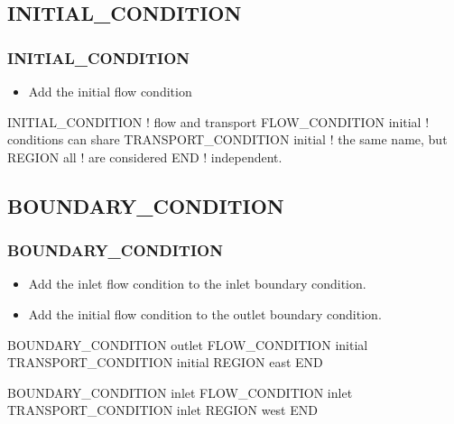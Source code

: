 \documentclass{beamer}
\newcommand\redcomment[1]{{{\color{red} #1}}}
\newcommand\bluecomment[1]{{{\color{blue} #1}}}
\newcommand\greencomment[1]{{{\color{green} #1}}}
\newcommand\magentacomment[1]{{{\color{magenta} #1}}}
\begin{document}
\subsection{INITIAL\_CONDITION}

\begin{frame}[fragile]\frametitle{INITIAL\_CONDITION}

\begin{itemize}
\item Add the \greencomment{initial} flow condition
\end{itemize}

\begin{semiverbatim}

INITIAL_CONDITION              \bluecomment{! flow and transport} 
  \magentacomment{FLOW_CONDITION initial}       \bluecomment{!   conditions can share}
  TRANSPORT_CONDITION initial  \bluecomment{!   the same name, but}
  REGION all                   \bluecomment{!   are considered}
END                            \bluecomment{!   independent.}
 
\end{semiverbatim}

\end{frame}

\subsection{BOUNDARY\_CONDITION}

\begin{frame}[fragile]\frametitle{BOUNDARY\_CONDITION}

\begin{itemize}
\item Add the \greencomment{inlet} flow condition to the \redcomment{inlet} boundary condition.
\item Add the \greencomment{initial} flow condition to the \redcomment{outlet} boundary condition.
\end{itemize}

\begin{semiverbatim}

BOUNDARY_CONDITION outlet      
  \magentacomment{FLOW_CONDITION initial}
  TRANSPORT_CONDITION initial 
  REGION east
END

BOUNDARY_CONDITION inlet
  \magentacomment{FLOW_CONDITION inlet}
  TRANSPORT_CONDITION inlet
  REGION west
END

\end{semiverbatim}

\end{frame}
\end{document}

